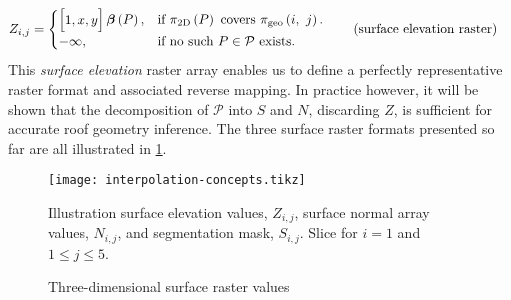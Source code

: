 \begin{align*}
  Z_{i,j} &= \begin{cases}
    \begin{bmatrix}1, x, y\end{bmatrix} \boldsymbol{\beta}\left(P\right), &\text{if } \pi_{\mathrm{2D}}\left(P\right) \text{ covers } \pi_{\mathrm{geo}}\left(i,~j\right).\\
    -\infty, &\text{if no such } P \in \mathcal{P} \text{ exists}.
  \end{cases}
  \tag{surface elevation raster}
\end{align*}
This \textit{surface elevation} raster array enables us to define a perfectly representative raster format and associated reverse mapping.
In practice however, it will be shown that the decomposition of $\mathcal{P}$ into $S$ and $N$, discarding $Z$, is sufficient for accurate roof geometry inference.
The three surface raster formats presented so far are all illustrated in \cref{fig:interpolation-concepts}.
\begin{figure}
  \centering
  \texttt{[image: interpolation-concepts.tikz]}
  \caption{Three-dimensional surface raster values}{%
    Illustration surface elevation values, $Z_{i,j}$, surface normal array values, $N_{i,j}$, and segmentation mask, $S_{i,j}$.
    Slice for $i = 1$ and $1 \leq j \leq 5$.
  }%
  \label{fig:interpolation-concepts}
\end{figure}

